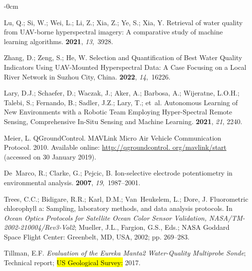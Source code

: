 \documentclass[remotesensing,article,accept,pdftex,moreauthors]{Definitions/mdpi}
\begin{document}
\begin{adjustwidth}{-\extralength}{0cm}
\begin{thebibliography}{999}
Lu, Q.; Si, W.; Wei, L.; Li, Z.; Xia, Z.; Ye, S.; Xia, Y.
\newblock Retrieval of water quality from UAV-borne hyperspectral imagery: A
  comparative study of machine learning algorithms.
 {\bf 2021}, {\em 13},~3928.

Zhang, D.; Zeng, S.; He, W.
\newblock Selection and Quantification of Best Water Quality Indicators Using
  UAV-Mounted Hyperspectral Data: A Case Focusing on a Local River Network in
  Suzhou City, China.
 {\bf 2022}, {\em 14},~16226.

Lary, D.J.; Schaefer, D.; Waczak, J.; Aker, A.; Barbosa, A.; Wijeratne, L.O.H.;
  Talebi, S.; Fernando, B.; Sadler, J.Z.; Lary, T.;  et~al.
\newblock Autonomous Learning of New Environments with a Robotic Team Employing
  Hyper-Spectral Remote Sensing, Comprehensive In-Situ Sensing and Machine
  Learning.
 {\bf 2021}, {\em 21}, 2240.

Meier, L.
\newblock QGroundControl.
\newblock  MAVLink Micro Air Vehicle Communication Protocol. 2010. Available
  online: \url{http://qgroundcontrol. org/mavlink/start} (accessed on 30 January
  2019).

De~Marco, R.; Clarke, G.; Pejcic, B.
\newblock Ion-selective electrode potentiometry in environmental analysis.
 {\bf 2007}, {\em 19},~1987--2001.

Trees, C.C.; Bidigare, R.R.; Karl, D.M.; Van~Heukelem, L.; Dore, J.
\newblock Fluorometric chlorophyll a: Sampling, laboratory methods, and data
  analysis protocols.
\newblock In \emph{Ocean Optics Protocols for Satellite Ocean Color Sensor
  Validation, NASA/TM-2002-210004/Rev3-Vol2};  Mueller, J.L., Fargion, G.S., Eds.; NASA Goddard Space Flight Center: Greenbelt, MD, USA, {2002}; pp. 269--283.

Tillman, E.F.
\newblock \emph{Evaluation of the Eureka Manta2 Water-Quality Multiprobe Sonde};
\newblock Technical report; \hl{US Geological Survey:} %
  2017.


\end{thebibliography}
\end{adjustwidth}
\end{document}
